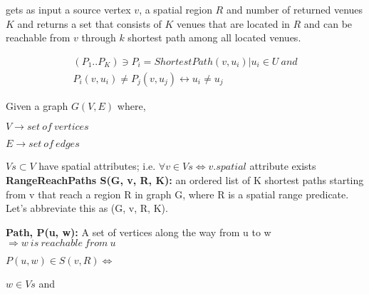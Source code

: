 {\query} gets as input a source vertex $v$, a spatial region $R$ and number of returned venues $K$ and returns a set that consists of $K$ venues that are located in $R$ and can be reachable from $v$ through $k$ shortest path among all located venues.

\iffalse
\begin{eqnarray*}
  	(P_1..P_K) \ni P_i = ShortestPath(v, u_i) | u_i \in U\ and\\
  	P_i(v, u_i) \neq P_j(v, u_j) \leftrightarrow u_i \neq u_j
\end{eqnarray*}


Given a graph $G(V, E)$ where,

\quad$V \rightarrow set\ of\ vertices$

\quad$E \rightarrow set\ of\ edges$

$Vs \subset V$ have spatial attributes; i.e. $\forall v \in Vs \Leftrightarrow v.spatial$ attribute exists\\


\textbf{RangeReachPaths S(G, v, R, K):} an ordered list of K shortest paths starting from v that reach a region R in graph G, where R is a spatial range predicate. Let's abbreviate this as {\rrp}(G, v, R, K).

\textbf{Path, P(u, w):} A set of vertices along the way from u to w \(\Rightarrow w\ is\ reachable\ from\ u\)

\quad${P(u, w) \in S(v, R) \Leftrightarrow}$

\quad{}

\quad\quad${w \in Vs}$ and

